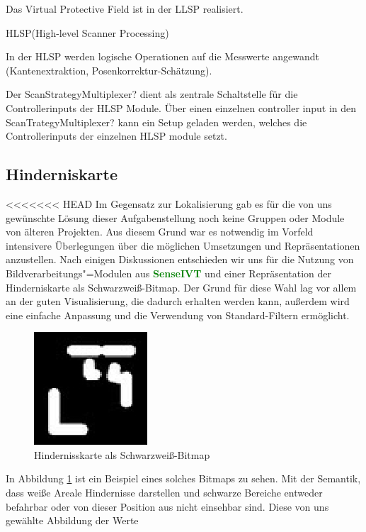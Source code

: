 Das Virtual Protective Field ist in der LLSP realisiert.

HLSP(High-level Scanner Processing)

In der HLSP werden logische Operationen auf die Messwerte angewandt (Kantenextraktion, Posenkorrektur-Schätzung).

Der ScanStrategyMultiplexer? dient als zentrale Schaltstelle für die Controllerinputs der HLSP Module.
 Über einen einzelnen controller input in den ScanTrategyMultiplexer? kann ein Setup geladen werden,
 welches die Controllerinputs der einzelnen HLSP module setzt.  

\subsection{Hinderniskarte}
<<<<<<< HEAD
 Im Gegensatz zur Lokalisierung gab es für die von uns gewünschte Lösung dieser
 Aufgabenstellung noch keine Gruppen oder Module von älteren Projekten. Aus
 diesem Grund war es notwendig im Vorfeld intensivere Überlegungen über die möglichen
 Umsetzungen und Repräsentationen anzustellen.
 Nach einigen Diskussionen entschieden wir uns für die Nutzung von
 Bildverarbeitungs"=Modulen aus \textcolor{green}{\textbf{SenseIVT}}  und
 einer Repräsentation der Hinderniskarte als Schwarzweiß-Bitmap. Der Grund für diese Wahl lag vor allem an der guten
 Visualisierung, die dadurch erhalten werden kann, außerdem wird eine einfache Anpassung und die Verwendung
 von Standard-Filtern ermöglicht. 
\begin{figure}[h]
\center
\includegraphics[scale=0.7]{graphics/hinderniskarte.jpg}
\caption{\label{fig:hinderniskarte} Hindernisskarte als Schwarzweiß-Bitmap}
\end{figure}
 In Abbildung \ref{fig:hinderniskarte} ist ein Beispiel eines solches Bitmaps
 zu sehen. Mit der Semantik, dass weiße Areale Hindernisse darstellen und schwarze Bereiche entweder befahrbar
 oder von dieser Position aus nicht einsehbar sind. Diese von uns gewählte Abbildung der Werte
